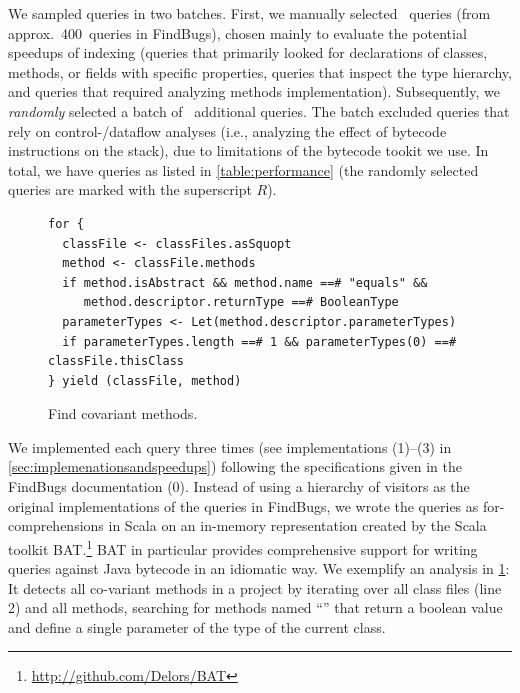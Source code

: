 We sampled queries in two batches. First, we manually selected \manualQueryCount~queries (from approx.\ 400~queries in FindBugs), chosen mainly to evaluate the potential speedups of indexing (queries that primarily looked for declarations of classes, methods, or fields with specific properties, queries that inspect the type hierarchy, and queries that required analyzing methods implementation).
Subsequently, we \emph{randomly} selected a batch of \randomQueryCount~additional queries. 
The batch excluded queries that rely on control-/dataflow analyses (i.e., analyzing the effect of bytecode instructions on the stack), due to limitations of the bytecode tookit we use.
In total, we have \queryCount{} queries as listed in \cref{table:performance} (the randomly selected queries are marked with the superscript $R$).




\begin{figure}
\centering
\begin{lstlisting}
for {
  classFile <- classFiles.asSquopt
  method <- classFile.methods
  if method.isAbstract && method.name ==# "equals" &&
     method.descriptor.returnType ==# BooleanType
  parameterTypes <- Let(method.descriptor.parameterTypes)
  if parameterTypes.length ==# 1 && parameterTypes(0) ==# classFile.thisClass
} yield (classFile, method)
\end{lstlisting}
\caption{Find covariant  methods.}
\label{fig:covariant-equals}
\end{figure}



We implemented each query three times (see implementations (1)--(3) in \cref{sec:implemenationsandspeedups}) following the specifications given in the FindBugs documentation (0). Instead of using a hierarchy of visitors as the original implementations of the queries in FindBugs, we wrote the queries as for-comprehensions in Scala on an in-memory representation created by the Scala toolkit BAT\@.\footnote{\url{http://github.com/Delors/BAT}}
BAT in particular provides comprehensive support for 
writing queries against Java bytecode in an idiomatic way.
We exemplify an analysis in \cref{fig:covariant-equals}: It detects all co-variant  methods in a project by iterating over all class files (line 2) and all methods, searching for methods named ``'' that return a boolean value and define a single parameter of the type of the current class. 


